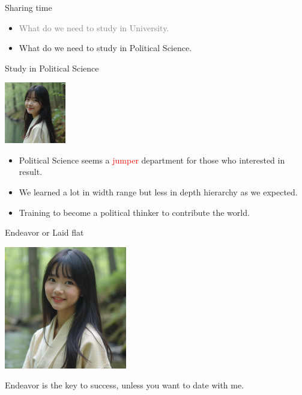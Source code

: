 \documentclass{beamer}
\begin{document}
\begin{frame}{Sharing time}
\begin{itemize}
\item \textcolor{gray}{What do we need to study in University.}
\item What do we need to study in Political Science.
\end{itemize}
\end{frame}
\begin{frame}{Study in Political Science}
\begin{center}
\includegraphics[width=0.2\textwidth]{motivate.png}
\end{center}
\begin{itemize}
\item Political Science seems a \textcolor{red}{jumper} department for those who interested in result.
\item We learned a lot in width range but less in depth hierarchy as we expected.
\item Training to become a political thinker to contribute the world.
\end{itemize}
\end{frame}
\begin{frame}{Endeavor or Laid flat}
\begin{center}
\includegraphics[width=0.4\textwidth]{fail.png}
\end{center}
\begin{center}
Endeavor is the key to success, unless you want to date with me.
\end{center}
\end{frame}
\end{document}

